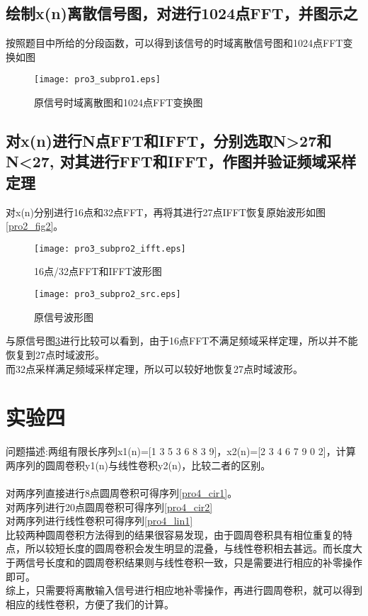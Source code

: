 \documentclass[aps,letterpaper,10pt]{revtex4}
\begin{document}
\begin{CJK}{UTF8}{gkai}
\subsection{绘制x(n)离散信号图，对进行1024点FFT，并图示之}
按照题目中所给的分段函数，可以得到该信号的时域离散信号图和1024点FFT变换如图
\begin{figure}
  \centering
  \texttt{[image: pro3\_subpro1.eps]}
  \caption{原信号时域离散图和1024点FFT变换图}
  \label{pro3_fig1}
\end{figure}
\subsection{对x(n)进行N点FFT和IFFT，分别选取N>27和N<27, 对其进行FFT和IFFT，作图并验证频域采样定理}
对x(n)分别进行16点和32点FFT，再将其进行27点IFFT恢复原始波形如图\ref{pro2_fig2}。
\begin{figure}
  \centering
  \texttt{[image: pro3\_subpro2\_ifft.eps]}
  \caption{16点/32点FFT和IFFT波形图}
  \label{pro3_fig2}
\end{figure}
\begin{figure}
  \centering
  \texttt{[image: pro3\_subpro2\_src.eps]}
  \caption{原信号波形图}
  \label{pro3_fig3}
\end{figure}
与原信号图\ref{pro3_fig3}进行比较可以看到，由于16点FFT不满足频域采样定理，所以并不能恢复到27点时域波形。\\
而32点采样满足频域采样定理，所以可以较好地恢复27点时域波形。
\section{实验四}
问题描述:两组有限长序列x1(n)=[1 3 5 3 6 8 3 9]，x2(n)=[2 3 4 6 7 9 0 2]，计算两序列的圆周卷积y1(n)与线性卷积y2(n)，比较二者的区别。\\\\
对两序列直接进行8点圆周卷积可得序列\ref{pro4_cir1}。
\begin{equation}
  \label{pro4_cir1}
\end{equation}
对两序列进行20点圆周卷积可得序列\ref{pro4_cir2}
\begin{equation}
  \label{pro4_cir2}
\end{equation}
对两序列进行线性卷积可得序列\ref{pro4_lin1}
\begin{equation}
  \label{pro4_lin1}
\end{equation}
比较两种圆周卷积方法得到的结果很容易发现，由于圆周卷积具有相位重复的特点，所以较短长度的圆周卷积会发生明显的混叠，与线性卷积相去甚远。而长度大于两信号长度和的圆周卷积结果则与线性卷积一致，只是需要进行相应的补零操作即可。\\
综上，只需要将离散输入信号进行相应地补零操作，再进行圆周卷积，就可以得到相应的线性卷积，方便了我们的计算。

\end{CJK}
\end{document}
